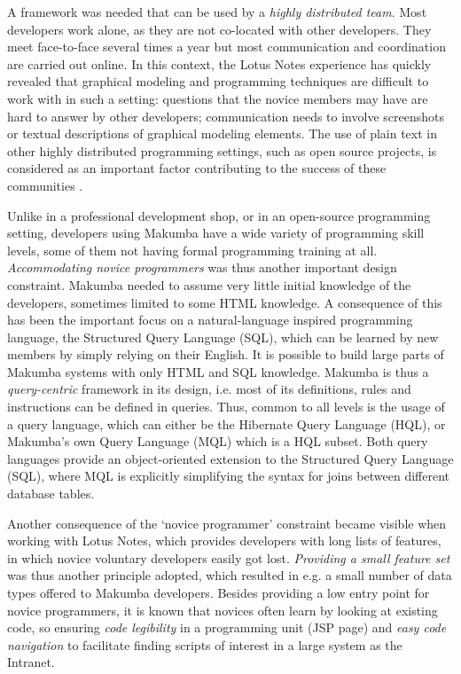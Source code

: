 \documentclass{llncs}
\begin{document}
A framework was needed that can be used by a \textit{highly distributed team}. Most developers work alone, as they are not co-located with other developers. They meet face-to-face several times a year but most communication and coordination are carried out online. In this context, the Lotus Notes experience has quickly revealed that graphical modeling and programming techniques are difficult to work with in such a setting: questions that the novice members may have are hard to answer by other developers; communication needs to involve screenshots or textual descriptions of graphical modeling elements. The use of plain text in other highly distributed programming settings, such as open source projects, is considered as an important factor contributing to the success of these communities \cite{yamauchi00}.

Unlike in a professional development shop, or in an open-source programming setting, developers using Makumba have a wide variety of programming skill levels, some of them not having formal programming training at all. \textit{Accommodating novice programmers} was thus another important design constraint. Makumba needed to assume very little initial knowledge of the developers, sometimes limited to some HTML knowledge. A consequence of this has been the important focus on a natural-language inspired programming language, the Structured Query Language (SQL), which can be learned by new members by simply relying on their English. It is possible to build large parts of Makumba systems with only HTML and SQL knowledge. Makumba is thus a \textit{query-centric} framework in its design, i.e. most of its definitions, rules and instructions can be defined in queries. Thus, common to all levels is the usage of a query language, which can either be the Hibernate Query Language (HQL), or Makumba's own Query Language (MQL) which is a HQL subset. Both query languages provide an object-oriented extension to the Structured Query Language (SQL), where MQL is explicitly simplifying the syntax for joins between different database tables.

Another consequence of the `novice programmer' constraint became visible when working with Lotus Notes, which provides developers with long lists of features, in which novice  voluntary developers easily got lost. \textit{Providing a small feature set} was thus another principle adopted, which resulted in e.g. a small number of data types offered to  Makumba developers. Besides providing a low entry point for novice programmers, it is known that novices often learn by looking at existing code, so ensuring \textit{code legibility} in a programming unit (JSP page) and \textit{easy code navigation} to facilitate finding scripts of interest in a large system as the Intranet.
\end{document}
